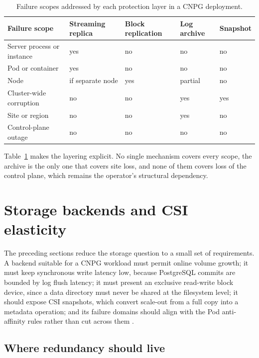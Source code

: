 \documentclass[11pt,a4paper]{article}
\begin{document}
\begin{table}[h]
\centering
\caption{Failure scopes addressed by each protection layer in a CNPG deployment.}
\label{tab:domains}
\begin{tabular}{@{}>{\raggedright\arraybackslash}p{3.4cm}>{\raggedright\arraybackslash}p{3.1cm}>{\raggedright\arraybackslash}p{3.1cm}>{\raggedright\arraybackslash}p{2.0cm}>{\raggedright\arraybackslash}p{1.9cm}@{}}
\toprule
Failure scope & Streaming replica & Block replication & Log archive & Snapshot \\
\midrule
Server process or instance & yes & no & no & no \\
Pod or container & yes & no & no & no \\
Node & if separate node & yes & partial & no \\
Cluster-wide corruption & no & no & yes & yes \\
Site or region & no & no & yes & no \\
Control-plane outage & no & no & no & no \\
\bottomrule
\end{tabular}
\end{table}

Table~\ref{tab:domains} makes the layering explicit. No single mechanism covers every scope, the archive is the only one that covers site loss, and none of them covers loss of the control plane, which remains the operator's structural dependency.

\section{Storage backends and CSI elasticity}
\label{sec:storage}

The preceding sections reduce the storage question to a small set of requirements. A backend suitable for a CNPG workload must permit online volume growth; it must keep synchronous write latency low, because PostgreSQL commits are bounded by log flush latency; it must present an exclusive read-write block device, since a data directory must never be shared at the filesystem level; it should expose CSI snapshots, which convert scale-out from a full copy into a metadata operation; and its failure domains should align with the Pod anti-affinity rules rather than cut across them \cite{k8s-csi,k8s-volumesnapshot}.

\subsection{Where redundancy should live}
\end{document}
